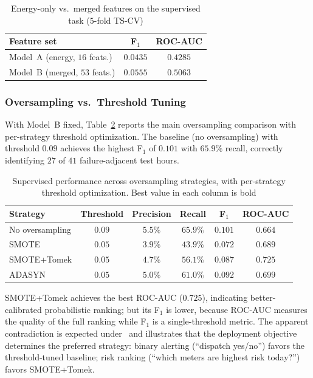 \documentclass[11pt]{article}
\begin{document}
\begin{enumerate}[leftmargin=1.5em,itemsep=1pt]
\begin{table}[H]
\centering
\caption{Energy-only vs.\ merged features on the supervised task ($5$-fold TS-CV)}
\label{tab:energy_vs_merged}
\begin{tabular}{lcc}
\toprule
\textbf{Feature set} & \textbf{F$_1$} & \textbf{ROC-AUC}\\
\midrule
Model~A (energy, $16$ feats.) & $0.0435$ & $0.4285$\\
Model~B (merged, $53$ feats.) & $\mathbf{0.0555}$ & $\mathbf{0.5063}$\\
\bottomrule
\end{tabular}
\end{table}

\subsubsection*{Oversampling vs.\ Threshold Tuning}
With Model~B fixed, Table~\ref{tab:supervised} reports the main oversampling comparison with per-strategy threshold optimization. The baseline (no oversampling) with threshold $0.09$ achieves the highest F$_1$ of $0.101$ with $65.9\%$ recall, correctly identifying $27$ of $41$ failure-adjacent test hours.

\begin{table}[H]
\centering
\caption{Supervised performance across oversampling strategies, with per-strategy threshold optimization. Best value in each column is bold}
\label{tab:supervised}
\begin{tabular}{lccccc}
\toprule
\textbf{Strategy} & \textbf{Threshold} & \textbf{Precision} & \textbf{Recall} & \textbf{F$_1$} & \textbf{ROC-AUC}\\
\midrule
No oversampling & $0.09$ & $5.5\%$ & $\mathbf{65.9\%}$ & $\mathbf{0.101}$ & $0.664$\\
SMOTE           & $0.05$ & $3.9\%$ & $43.9\%$ & $0.072$ & $0.689$\\
SMOTE+Tomek     & $0.05$ & $4.7\%$ & $56.1\%$ & $0.087$ & $\mathbf{0.725}$\\
ADASYN          & $0.05$ & $5.0\%$ & $61.0\%$ & $0.092$ & $0.699$\\
\bottomrule
\end{tabular}
\end{table}

SMOTE+Tomek achieves the best ROC-AUC ($0.725$), indicating better-calibrated probabilistic ranking; but its F$_1$ is lower, because ROC-AUC measures the quality of the full ranking while F$_1$ is a single-threshold metric. The apparent contradiction is expected under~\cite{saito2015precision} and illustrates that the deployment objective determines the preferred strategy: binary alerting (``dispatch yes/no'') favors the threshold-tuned baseline; risk ranking (``which meters are highest risk today?'') favors SMOTE+Tomek.


\end{enumerate}
\end{document}
